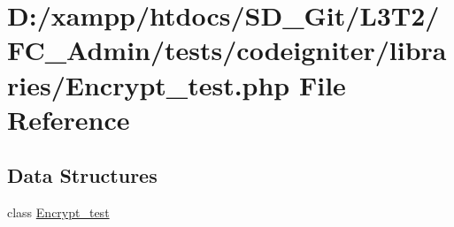 \hypertarget{_encrypt__test_8php}{}\section{D\+:/xampp/htdocs/\+S\+D\+\_\+\+Git/\+L3\+T2/\+F\+C\+\_\+\+Admin/tests/codeigniter/libraries/\+Encrypt\+\_\+test.php File Reference}
\label{_encrypt__test_8php}
\subsection*{Data Structures}
\begin{DoxyCompactItemize}
\item 
class \hyperlink{class_encrypt__test}{Encrypt\+\_\+test}
\end{DoxyCompactItemize}
